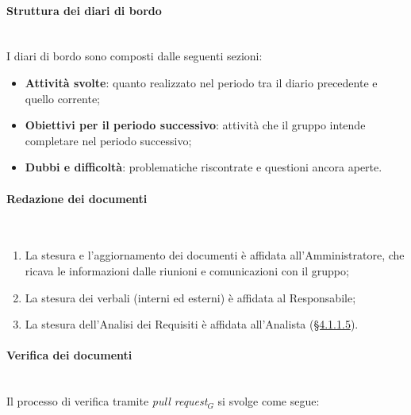\documentclass[10pt, letterpaper]{article}
\newcommand{\trisubsection}[1]{\paragraph{#1}\mbox{}\\}
\begin{document}
\trisubsection{Struttura dei diari di bordo}
I diari di bordo sono composti dalle seguenti sezioni:
\begin{itemize}
    \item \textbf{Attività svolte}: quanto realizzato nel periodo tra il diario precedente e quello corrente;
    \item \textbf{Obiettivi per il periodo successivo}: attività che il gruppo intende completare nel periodo successivo;
    \item \textbf{Dubbi e difficoltà}: problematiche riscontrate e questioni ancora aperte.
\end{itemize}

\trisubsection{Redazione dei documenti}
\label{sec:Redazione}
\begin{enumerate}
    \item La stesura e l'aggiornamento dei documenti è affidata all'Amministratore, che ricava le informazioni dalle riunioni e comunicazioni con il gruppo;
    \item La stesura dei verbali (interni ed esterni) è affidata al Responsabile;
    \item La stesura dell'Analisi dei Requisiti è affidata all'Analista (\hyperref[sec:Analista]{§4.1.1.5}).
\end{enumerate}

\trisubsection{Verifica dei documenti}
\label{sec:Verifica}
\label{sec:Verifica_doc}
Il processo di verifica tramite \textit{pull request}$_{G}$ si svolge come segue:
\end{document}
